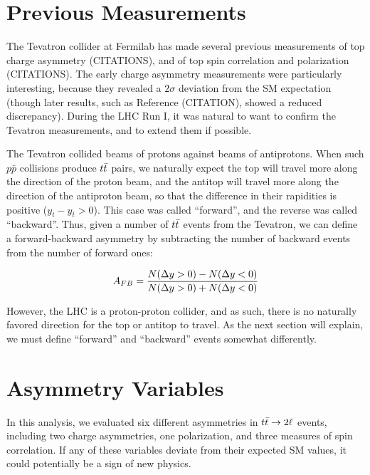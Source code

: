 
\section{Previous Measurements}
\label{sec:afb:tevatron}

The Tevatron collider at Fermilab has made several previous measurements of
top charge asymmetry (CITATIONS), and of top spin %
correlation and polarization (CITATIONS). The
early charge asymmetry measurements were particularly interesting, because
they revealed a $2\sigma$ deviation from the SM expectation (though
later results, such as Reference (CITATION), showed a
reduced discrepancy). During the LHC Run I, it was
natural to want to confirm the Tevatron measurements, and to extend
them if possible.

The Tevatron collided beams of protons against beams of
antiprotons. When such $p\bar{p}$ collisions produce
$t\bar{t}$ pairs, we naturally expect the top will travel more along the direction
of the proton beam, and the antitop will travel
more along the direction of the antiproton beam, so that the
difference in their rapidities is positive ($y_t - y_{\bar{t}} > 0$).
This case was called ``forward'', and the reverse was called
``backward''. Thus, given a number of $t\bar{t}$
events from the Tevatron, we can define a forward-backward
asymmetry by subtracting the number of backward events from the number
of forward ones:

\begin{equation}
A_{FB} = \frac{N(\Delta y>0) - N(\Delta y<0)}{N(\Delta y>0) + N(\Delta y<0)}
\end{equation}

However, the LHC is a proton-proton collider, and as such, there is no
naturally favored direction for the top or antitop to travel. As the
next section will explain, we must define ``forward'' and ``backward''
events somewhat differently.

\section{Asymmetry Variables}
\label{sec:afb:variables}

In this analysis, we evaluated six different asymmetries in $t\bar{t} \rightarrow 2\ell$
events, including two charge asymmetries, one
polarization, and three measures of spin correlation. If any of these
variables deviate from their expected SM values, it could potentially
be a sign of new physics.

